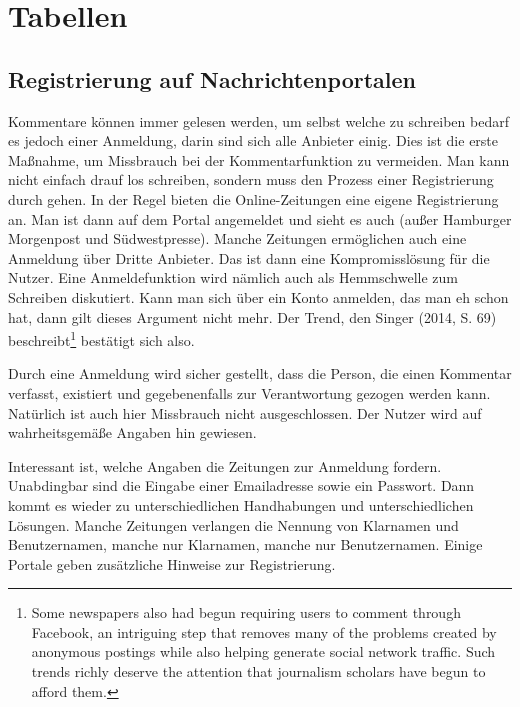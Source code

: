\chapter{Tabellen}


\section{Registrierung auf Nachrichtenportalen}

Kommentare können immer gelesen werden, um selbst welche zu schreiben bedarf es
jedoch einer Anmeldung, darin sind sich alle Anbieter einig. Dies ist die erste
Maßnahme, um Missbrauch bei der Kommentarfunktion zu vermeiden. Man kann nicht
einfach drauf los schreiben, sondern muss den Prozess einer Registrierung durch
gehen. In der Regel bieten die Online-Zeitungen eine eigene Registrierung an.
Man ist dann auf dem Portal angemeldet und sieht es auch (außer Hamburger
Morgenpost und Südwestpresse). Manche Zeitungen ermöglichen auch eine Anmeldung
über Dritte Anbieter. Das ist dann eine Kompromisslösung für die Nutzer. Eine
Anmeldefunktion wird nämlich auch als Hemmschwelle zum Schreiben diskutiert.
Kann man sich über ein Konto anmelden, das man eh schon hat, dann gilt dieses
Argument nicht mehr. Der Trend, den Singer (2014, S. 69)
beschreibt\footnote{\glqq Some newspapers also had begun requiring users to
comment through Facebook, an intriguing step that removes many of the problems
created by anonymous postings while also helping generate social network
traffic. Such trends richly deserve the attention that journalism scholars have
begun to afford them.\grqq} bestätigt sich also.

Durch eine Anmeldung wird sicher gestellt, dass die Person, die einen Kommentar
verfasst, existiert und gegebenenfalls zur Verantwortung gezogen werden kann.
Natürlich ist auch hier Missbrauch nicht ausgeschlossen. Der Nutzer wird auf
wahrheitsgemäße Angaben hin gewiesen. 

Interessant ist, welche Angaben die Zeitungen zur Anmeldung fordern. Unabdingbar
sind die Eingabe einer Emailadresse sowie ein Passwort. Dann kommt es wieder zu
unterschiedlichen Handhabungen und unterschiedlichen Lösungen. Manche Zeitungen
verlangen die Nennung von Klarnamen und Benutzernamen, manche nur Klarnamen,
manche nur Benutzernamen. Einige Portale geben zusätzliche Hinweise zur
Registrierung. 


